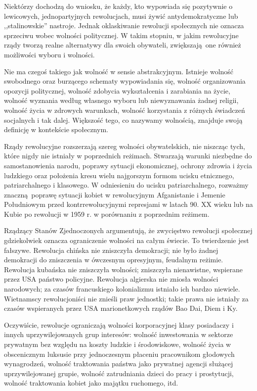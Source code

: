 \documentclass[12pt]{book}
\begin{document}
Niektórzy dochodzą do wniosku, że każdy, kto wypowiada się pozytywnie o lewicowych, jednopartyjnych rewolucjach, musi żywić antydemokratyczne lub ,,stalinowskie'' nastroje. Jednak oklaskiwanie rewolucji społecznych nie oznacza sprzeciwu wobec wolności politycznej. W takim stopniu, w jakim rewolucyjne rządy tworzą realne alternatywy dla swoich obywateli, zwiększają one również możliwości wyboru i wolności.

Nie ma czegoś takiego jak wolność w sensie abstrakcyjnym. Istnieje wolność swobodnego oraz burzącego schematy wypowiadania się, wolność organizowania opozycji politycznej, wolność zdobycia wykształcenia i zarabiania na życie, wolność wyznania według własnego wyboru lub niewyznawania żadnej religii, wolność życia w zdrowych warunkach, wolność korzystania z różnych świadczeń socjalnych i tak dalej. Większość tego, co nazywamy wolnością, znajduje swoją definicję w kontekście społecznym.

Rządy rewolucyjne rozszerzają szereg wolności obywatelskich, nie niszcząc tych, które nigdy nie istniały w poprzednich reżimach. Stwarzają warunki niezbędne do samostanowienia narodu, poprawy sytuacji ekonomicznej, ochrony zdrowia i życia ludzkiego oraz położenia kresu wielu najgorszym formom ucisku etnicznego, patriarchalnego i klasowego. W odniesieniu do ucisku patriarchalnego, rozważmy znaczną poprawę sytuacji kobiet w rewolucyjnym Afganistanie i Jemenie Południowym przed kontrrewolucyjnymi represjami w latach 90. XX wieku lub na Kubie po rewolucji w 1959 r. w porównaniu z poprzednim reżimem.

Rządzący Stanów Zjednoczonych argumentują, że zwycięstwo rewolucji społecznej gdziekolwiek oznacza ograniczenie wolności na całym świecie. To twierdzenie jest fałszywe. Rewolucja chińska nie zniszczyła demokracji; nie było żadnej demokracji do zniszczenia w ówczesnym opresyjnym, feudalnym reżimie. Rewolucja kubańska nie zniszczyła wolności; zniszczyła nienawistne, wspierane przez USA państwo policyjne. Rewolucja algierska nie zniosła wolności narodowych; za czasów francuskiego kolonializmu istniało ich bardzo niewiele. Wietnamscy rewolucjoniści nie znieśli praw jednostki; takie prawa nie istniały za czasów wspieranych przez USA marionetkowych rządów Bao Dai, Diem i Ky.

Oczywiście, rewolucje ograniczają wolności korporacyjnej klasy posiadaczy i innych uprzywilejowanych grup interesów: wolność inwestowania w sektorze prywatnym bez względu na koszty ludzkie i środowiskowe, wolność życia w obscenicznym luksusie przy jednoczesnym płaceniu pracownikom głodowych wynagrodzeń, wolność traktowania państwa jako prywatnej agencji służącej uprzywilejowanej grupie, wolność zatrudniania dzieci do pracy i prostytucji, wolność traktowania kobiet jako majątku ruchomego, itd.
\end{document}
